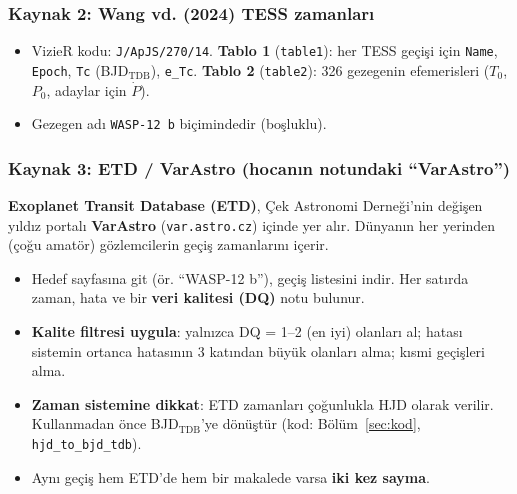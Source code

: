 \subsubsection*{Kaynak 2: Wang vd. (2024) TESS zamanları}
\begin{itemize}[leftmargin=*]
\item VizieR kodu: \texttt{J/ApJS/270/14}. \textbf{Tablo 1} (\texttt{table1}): her TESS geçişi için \texttt{Name},
      \texttt{Epoch}, \texttt{Tc} (BJD$_\mathrm{TDB}$), \texttt{e\_Tc}. \textbf{Tablo 2} (\texttt{table2}): 326 gezegenin
      efemerisleri ($T_0$, $P_0$, adaylar için $\dot P$).
\item Gezegen adı \texttt{WASP-12 b} biçimindedir (boşluklu).
\end{itemize}

\subsubsection*{Kaynak 3: ETD / VarAstro (hocanın notundaki “VarAstro”)}
\textbf{Exoplanet Transit Database (ETD)}, Çek Astronomi Derneği'nin değişen yıldız portalı \textbf{VarAstro}
(\texttt{var.astro.cz}) içinde yer alır. Dünyanın her yerinden (çoğu amatör) gözlemcilerin geçiş zamanlarını içerir.
\begin{itemize}[leftmargin=*]
\item Hedef sayfasına git (ör. “WASP-12 b”), geçiş listesini indir. Her satırda zaman, hata ve bir
      \textbf{veri kalitesi (DQ)} notu bulunur.
\item \textbf{Kalite filtresi uygula}: yalnızca DQ = 1–2 (en iyi) olanları al; hatası sistemin ortanca hatasının
      3 katından büyük olanları alma; kısmi geçişleri alma.
\item \textbf{Zaman sistemine dikkat}: ETD zamanları çoğunlukla HJD olarak verilir. Kullanmadan önce
      BJD$_\mathrm{TDB}$'ye dönüştür (kod: Bölüm~\ref{sec:kod}, \texttt{hjd\_to\_bjd\_tdb}).
\item Aynı geçiş hem ETD'de hem bir makalede varsa \textbf{iki kez sayma}.
\end{itemize}

